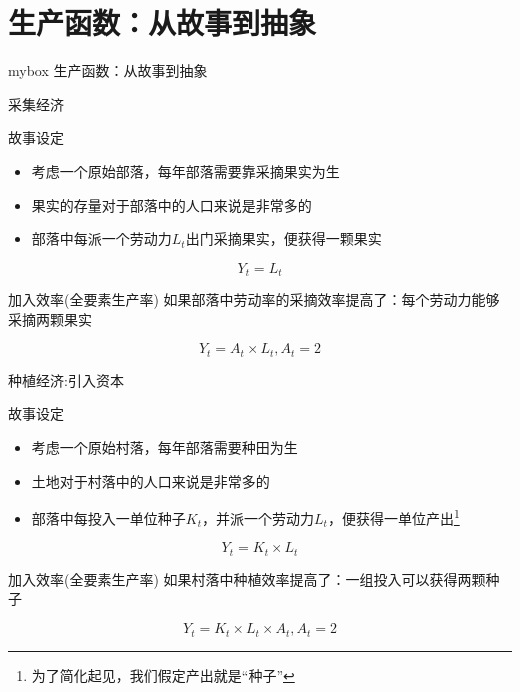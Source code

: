 \documentclass[aspectratio=32]{beamer}
\begin{document}
\section{生产函数：从故事到抽象}
\begin{frame}
\begin{center}
    \begin{minipage}{1\textwidth}
		\begin{beamercolorbox}[wd=0.7\textwidth, rounded=true, shadow=true]{mybox}
			\LARGE \centering 生产函数：从故事到抽象
		\end{beamercolorbox}
    \end{minipage}
\end{center} 
\end{frame}


\begin{frame}{采集经济}
\begin{block}{故事设定}
\begin{itemize}
    \item 考虑一个原始部落，每年部落需要靠采摘果实为生
    \item 果实的存量对于部落中的人口来说是非常多的
    \item 部落中每派一个劳动力\(L_t\)出门采摘果实，便获得一颗果实
\end{itemize}
\end{block}
\[
Y_t=L_t
\]
\begin{block}{加入效率(全要素生产率)}
    如果部落中劳动率的采摘效率提高了：每个劳动力能够采摘两颗果实
\end{block}
\[
Y_t=A_{t} \times L_{t},A_{t}=2
\]
\end{frame}

\begin{frame}{种植经济:引入资本}
\begin{block}{故事设定}
\begin{itemize}
    \item 考虑一个原始村落，每年部落需要种田为生
    \item 土地对于村落中的人口来说是非常多的
    \item 部落中每投入一单位种子\(K_t\)，并派一个劳动力\(L_t\)，便获得一单位产出\footnote{为了简化起见，我们假定产出就是“种子”}
\end{itemize}
\end{block}
\[
Y_t=K_t \times L_t
\]

\begin{block}{加入效率(全要素生产率)}
    如果村落中种植效率提高了：一组投入可以获得两颗种子
\end{block}
\[
Y_t=K_t \times L_t \times A_{t},A_{t}=2
\]
\end{frame}
\end{document}
